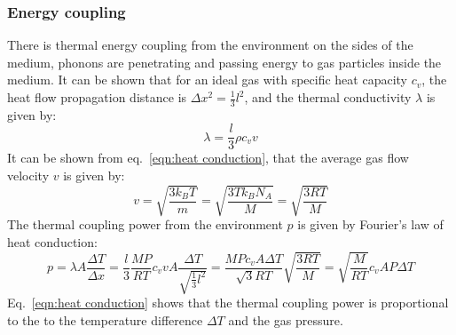 \documentclass[\main/master.tex]{subfiles}
\begin{document}
\subsubsection{Energy coupling}
There is thermal energy coupling from the environment on the sides of the medium, phonons are penetrating and passing energy to gas particles inside the medium. It can be shown that for an ideal gas with specific heat capacity $c_v$, the heat flow propagation distance is $\Delta x ^2  = \frac{1}{3} l^2 $, and the thermal conductivity $\lambda$ is given by:
\begin{equation}
\lambda  = \frac{l}{3}\rho c_v v    \label{eqn:heat conduction coefficient}
\end{equation}
It can be shown from eq.~\ref{eqn:heat conduction}, that the average gas flow velocity $v$ is given by:
\begin{equation}
v =\sqrt{\frac{3k_B T}{m}}=\sqrt{\frac{3 T k_B N_A}{M}} =  \sqrt{\frac{3RT}{M}}   
\label{eqn:flow velocity}
\end{equation}
The thermal coupling power from the environment $p$ is given by Fourier's law of heat conduction:
\begin{equation}
p =  \lambda A \frac{\Delta T}{\Delta x} =\frac{l}{3} \frac{MP}{RT} c_v v A \frac{\Delta T}{\sqrt{\frac{1}{3} l^2 }} = \frac{M P c_v  A \Delta T}{\sqrt{3}RT} \sqrt{\frac{3RT}{M}} =   \sqrt{\frac{M}{RT}} c_v  A P  \Delta T 
\label{eqn:heat conduction}
\end{equation}
Eq.~\ref{eqn:heat conduction} shows that the thermal coupling power is proportional to the to the temperature difference $\Delta T$ and the gas pressure.
\iffalse
\end{document}
